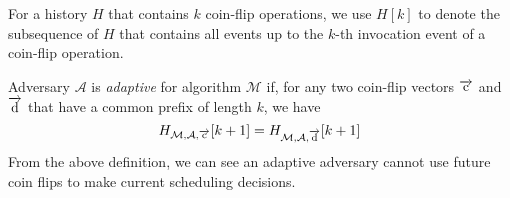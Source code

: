 For a history $H$ that contains $k$ coin-flip operations, we use $H[k]$ to denote the subsequence of
$H$ that contains all events up to the $k$-th invocation event of a coin-flip operation.

Adversary $\mathcal{A}$ is \emph{adaptive} for algorithm $\mathcal{M}$ if, for any two coin-flip
vectors $\overrightarrow{\rm c}$ and $\overrightarrow{\rm d}$ that have a common prefix
of length $k$, we have
$$H_{\mathcal{M},\mathcal{A}, \overrightarrow{\rm c}}[k+1] = H_{\mathcal{M},\mathcal{A}, \overrightarrow{\rm d}}[k+1]$$
From the above definition, we can see an adaptive adversary cannot use
future coin flips to make current scheduling decisions.
